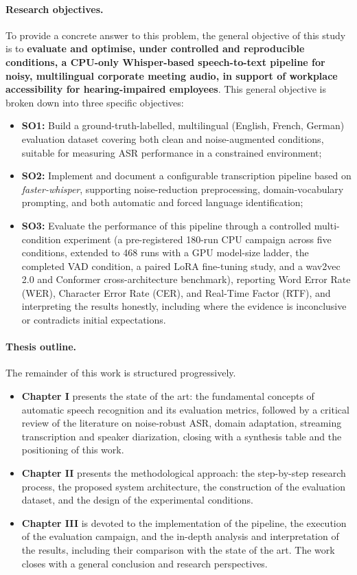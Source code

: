 \documentclass[12pt]{report}
\begin{document}
\paragraph{Research objectives.}
To provide a concrete answer to this problem, the general objective of this study is to \textbf{evaluate and optimise, under controlled and reproducible conditions, a CPU-only Whisper-based speech-to-text pipeline for noisy, multilingual corporate meeting audio, in support of workplace accessibility for hearing-impaired employees}. This general objective is broken down into three specific objectives:
\begin{itemize}
    \item \textbf{SO1:} Build a ground-truth-labelled, multilingual (English, French, German) evaluation dataset covering both clean and noise-augmented conditions, suitable for measuring ASR performance in a constrained environment;
    \item \textbf{SO2:} Implement and document a configurable transcription pipeline based on \textit{faster-whisper}, supporting noise-reduction preprocessing, domain-vocabulary prompting, and both automatic and forced language identification;
    \item \textbf{SO3:} Evaluate the performance of this pipeline through a controlled multi-condition experiment (a pre-registered 180-run CPU campaign across five conditions, extended to 468 runs with a GPU model-size ladder, the completed VAD condition, a paired LoRA fine-tuning study, and a wav2vec 2.0 and Conformer cross-architecture benchmark), reporting Word Error Rate (WER), Character Error Rate (CER), and Real-Time Factor (RTF), and interpreting the results honestly, including where the evidence is inconclusive or contradicts initial expectations.
\end{itemize}
\paragraph{Thesis outline.}
The remainder of this work is structured progressively.
\begin{itemize}
    \item \textbf{Chapter I} presents the state of the art: the fundamental concepts of automatic speech recognition and its evaluation metrics, followed by a critical review of the literature on noise-robust ASR, domain adaptation, streaming transcription and speaker diarization, closing with a synthesis table and the positioning of this work.
    \item \textbf{Chapter II} presents the methodological approach: the step-by-step research process, the proposed system architecture, the construction of the evaluation dataset, and the design of the experimental conditions.
    \item \textbf{Chapter III} is devoted to the implementation of the pipeline, the execution of the evaluation campaign, and the in-depth analysis and interpretation of the results, including their comparison with the state of the art. The work closes with a general conclusion and research perspectives.
\end{itemize}
\newpage
\end{document}
